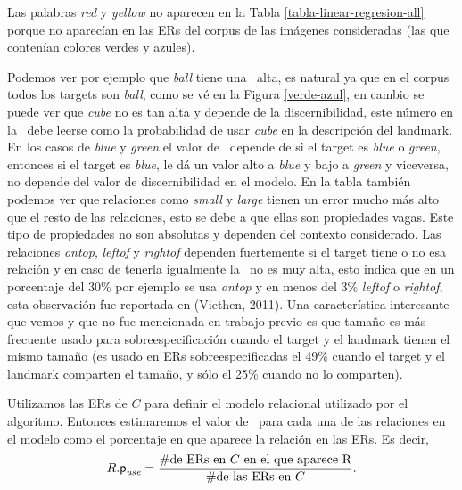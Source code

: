 Las palabras {\it red} y {\it yellow} no aparecen en la Tabla \ref{tabla-linear-regresion-all} porque no aparec\'ian en las ERs del corpus de las im\'agenes consideradas (las que conten\'ian colores verdes y azules).



Podemos ver por ejemplo que {\it ball} tiene una \puse\ alta, es natural ya que en el corpus todos los targets son {\it ball}, como se v\'e en la Figura \ref{verde-azul}, en cambio se puede ver que {\it cube} no es tan alta y depende de la discernibilidad, este n\'umero en la \puse\ debe leerse como la probabilidad de usar {\it cube} en la descripci\'on del landmark. En los casos de {\it blue} y {\it green} el valor de \puse\ depende de si el target es {\it blue} o {\it green}, entonces si el target es {\it blue}, le d\'a un valor alto a {\it blue} y bajo a {\it green} y viceversa, no depende del valor de discernibilidad en el modelo. En la tabla tambi\'en podemos ver que relaciones como {\it small} y {\it large} tienen un error mucho m\'as alto que el resto de las relaciones, esto se debe a que ellas son propiedades vagas. Este tipo de propiedades no son absolutas y dependen del contexto considerado.
Las relaciones {\it ontop}, {\it leftof} y {\it rightof} dependen fuertemente si el target tiene o no esa relaci\'on y en caso de tenerla igualmente la \puse\ no es muy alta, esto indica que en un porcentaje del 30\% por ejemplo se usa {\it ontop} y en menos del 3\% {\it leftof} o {\it rightof}, esta observaci\'on fue reportada en (Viethen, 2011). Una caracter\'istica interesante que vemos y que no fue mencionada en trabajo previo es que tama\~no es m\'as frecuente usado para sobreespecificaci\'on cuando el target y el landmark tienen el mismo tama\~no 
(es usado en ERs sobreespecificadas el 49\% cuando el target y el landmark comparten el tama\~no, y s\'olo el 25\% cuando no lo comparten).

 Utilizamos las ERs de $C$
para definir el modelo relacional utilizado por el algoritmo. Entonces 
estimaremos el valor de \puse\ para cada una de las relaciones en el modelo como el
porcentaje en que aparece la relaci\'on en las ERs. Es decir,
\begin{equation} \label{eq1}
R.\textsf{p}_\textit{use} = \frac {\#\mbox{de ERs en $C$ en el que aparece R}} {\#\mbox{de las ERs en $C$}}.
\end{equation}

